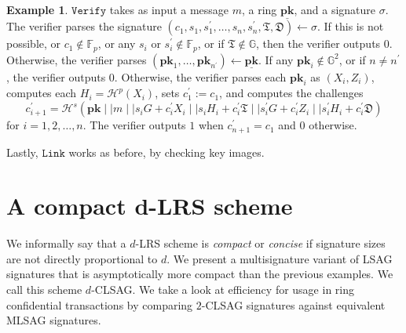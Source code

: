 \documentclass{mrl}
\theoremstyle{plain}
\theoremstyle{definition}
\newtheorem{example}{Example}[section]
\begin{document}
\begin{example}
$\texttt{Verify}$ takes as input a message $m$, a ring $\underline{\textbf{pk}}$, and a signature $\sigma$. The verifier parses the signature $(c_1, s_1, s_1^\prime, \ldots, s_n, s_n^\prime, \mathfrak{T}, \mathfrak{D}) \leftarrow \sigma$. If this is not possible, or $c_1 \notin \mathbb{F}_p$, or any $s_i$ or $s_i^\prime \notin \mathbb{F}_p$, or if $\mathfrak{T} \notin \mathbb{G}$, then the verifier outputs $0$. Otherwise, the verifier parses $(\textbf{pk}_1, \ldots, \textbf{pk}_{n^\prime}) \leftarrow \underline{\textbf{pk}}$. If any $\textbf{pk}_i \notin \mathbb{G}^2$, or if $n \neq n^\prime$, the verifier outputs $0$. Otherwise, the verifier parses each $\textbf{pk}_i$ as $(X_i, Z_i)$, computes each $H_i = \mathcal{H}^p(X_i)$, sets $c_1^\prime := c_1$, and computes the challenges $$c_{i+1}^\prime = \mathcal{H}^s(\textbf{pk} \mid \mid m \mid \mid s_i G + c_i^\prime X_i \mid \mid s_i H_i + c_i^\prime \mathfrak{T} \mid \mid s_i^\prime G + c_i^\prime Z_i \mid \mid s_i^\prime H_i + c_i^\prime \mathfrak{D})$$ for $i=1, 2, \ldots, n$. The verifier outputs $1$ when $c_{n+1}^\prime = c_1$ and $0$ otherwise. 

Lastly, $\texttt{Link}$ works as before, by checking key images.
\end{example}


\section{A compact d-LRS scheme}\label{sec:themainthing}
We informally say that a $d$-LRS scheme is \textit{compact} or \textit{concise} if signature sizes are not directly proportional to $d$. We present a multisignature variant of LSAG signatures that is asymptotically more compact than the previous examples. We call this scheme $d$-CLSAG. We take a look at efficiency for usage in ring confidential transactions by comparing $2$-CLSAG signatures against equivalent MLSAG signatures.
\end{document}
